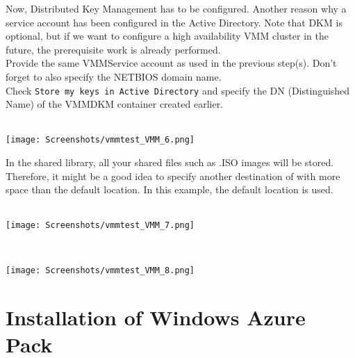 \clearpage

Now, Distributed Key Management has to be configured. Another reason why a service account has been configured in the Active Directory. Note that DKM is optional, but if we want to configure a high availability VMM cluster in the future, the prerequisite work is already performed. \\
Provide the same VMMService account as used in the previous step(s). Don't forget to also specify the NETBIOS domain name. \\
Check \texttt{Store my keys in Active Directory} and specify the DN (Distinguished Name) of the VMMDKM container created earlier.
$\;$ \\ \\
\noindent\begin{minipage}{\textwidth}
    \centering
    \texttt{[image: Screenshots/vmmtest\_VMM\_6.png]}
\end{minipage}

\clearpage

In the shared library, all your shared files such as .ISO images will be stored. Therefore, it might be a good idea to specify another destination of with more space than the default location. In this example, the default location is used.
$\;$ \\ \\
\noindent\begin{minipage}{\textwidth}
    \centering
    \texttt{[image: Screenshots/vmmtest\_VMM\_7.png]}
\end{minipage}
$\;$ \\ \\
\noindent\begin{minipage}{\textwidth}
    \centering
    \texttt{[image: Screenshots/vmmtest\_VMM\_8.png]}
\end{minipage}

\section{Installation of Windows Azure Pack}

